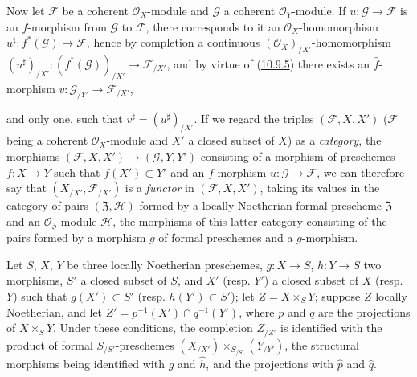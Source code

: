 \begin{env}[10.9.6]
\label{I.10.9.6}
Now let $\mathscr{F}$ be a coherent $\mathscr{O}_X$-module and
$\mathscr{G}$ a coherent $\mathscr{O}_Y$-module. If
$u:\mathscr{G}\to\mathscr{F}$ is an $f$-morphism from $\mathscr{G}$ to
$\mathscr{F}$, there corresponds to it an $\mathscr{O}_X$-homomorphism
$u^\sharp:f^*(\mathscr{G})\to\mathscr{F}$, hence by completion a
continuous $(\mathscr{O}_X)_{/X'}$-homomorphism
$(u^\sharp)_{/X'}:(f^*(\mathscr{G}))_{/X'}\to\mathscr{F}_{/X'}$, and by
virtue of (\hyperref[I.10.9.5]{10.9.5}) there exists an
$\widehat f$-morphism $v:\mathscr{G}_{/Y'}\to\mathscr{F}_{/X'}$,

and only one, such that $v^\sharp=(u^\sharp)_{/X'}$. If we regard the
triples $(\mathscr{F},X,X')$ ($\mathscr{F}$ being a coherent
$\mathscr{O}_X$-module and $X'$ a closed subset of $X$) as
a \emph{category}, the morphisms
$(\mathscr{F},X,X')\to(\mathscr{G},Y,Y')$ consisting of a morphism of
preschemes $f:X\to Y$ such that $f(X')\subset Y'$ and an
$f$-morphism $u:\mathscr{G}\to\mathscr{F}$, we can therefore say that
$(X_{/X'},\mathscr{F}_{/X'})$ is a \emph{functor} in
$(\mathscr{F},X,X')$, taking its values in the category of pairs
$(\mathfrak{Z},\mathscr{H})$ formed by a locally Noetherian formal
prescheme $\mathfrak{Z}$ and an
$\mathscr{O}_{\mathfrak{Z}}$-module $\mathscr{H}$, the morphisms of
this latter category consisting of the pairs formed by a morphism
$g$ of formal preschemes and a $g$-morphism.
\end{env}

\begin{proposition}[10.9.7]
\label{I.10.9.7}
Let $S$, $X$, $Y$ be three locally Noetherian preschemes,
$g:X\to S$, $h:Y\to S$ two morphisms, $S'$ a closed subset of $S$,
and $X'$ (resp. $Y'$) a closed subset of $X$ (resp. $Y$) such that
$g(X')\subset S'$ (resp. $h(Y')\subset S'$); let
$Z=X\times_S Y$; suppose $Z$ locally Noetherian, and let
$Z'=p^{-1}(X')\cap q^{-1}(Y')$, where $p$ and $q$ are the projections of
$X\times_S Y$. Under these conditions, the completion $Z_{/Z'}$ is
identified with the product of formal $S_{/S'}$-preschemes
$(X_{/X'})\times_{S_{/S'}}(Y_{/Y'})$, the structural morphisms
being identified with $\widehat g$ and $\widehat h$, and the projections
with $\widehat p$ and $\widehat q$.
\end{proposition}

